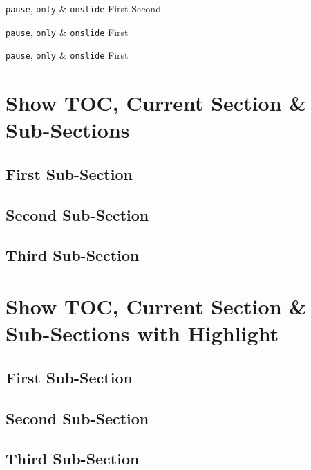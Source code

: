 \documentclass[aspectratio=169,9pt]{beamer}
\begin{document}
    

    \begin{frame}{\texttt{pause}, \texttt{only} \& \texttt{onslide}}
        First
        \pause
        Second
    \end{frame}

    \begin{frame}{\texttt{pause}, \texttt{only} \& \texttt{onslide}}
        First
    \end{frame}

    \begin{frame}{\texttt{pause}, \texttt{only} \& \texttt{onslide}}
        First
    \end{frame}

\section{Show TOC, Current Section \& Sub-Sections}
    \subsection{First Sub-Section}
    \subsection{Second Sub-Section}
    \subsection{Third Sub-Section}

\section{Show TOC, Current Section \& Sub-Sections with Highlight}
    \subsection{First Sub-Section}\subsectionFrame
    \subsection{Second Sub-Section}\subsectionFrame
    \subsection{Third Sub-Section}\subsectionFrame
\end{document}
